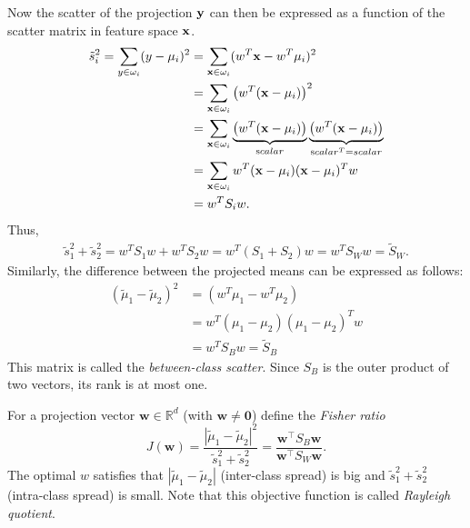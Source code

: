 Now the scatter of the projection ${\mathbf{y}}$ can then be expressed as a function of the scatter matrix in feature space ${\mathbf{x}}$.
\begin{align*}
	\tilde{s}_i^2 = \sum_{y\in \omega_i}(y-\mu_i)^2 &= \sum_{{\mathbf{x}}\in\omega_i}(w^T{\mathbf{x}} - w^T\mu_i)^2\\
													&= \sum_{{\mathbf{x}}\in\omega_i}\left(w^T({\mathbf{x}} - \mu_i)\right)^2\\
													&= \sum_{{\mathbf{x}}\in\omega_i}\underbrace{\left(w^T({\mathbf{x}} - \mu_i)\right)}_{\text scalar}\underbrace{\left(w^T({\mathbf{x}} - \mu_i)\right)}_{\text scalar^T=scalar}\\
													&= \sum_{{\mathbf{x}}\in\omega_i}w^T({\mathbf{x}} - \mu_i)({\mathbf{x}} - \mu_i)^Tw\\
													&= w^TS_iw.
\end{align*}
Thus, 
\begin{align*}
	\tilde{s}_1^2+\tilde{s}_2^2 = w^TS_1w+w^TS_2w = w^T(S_1+S_2)w = w^TS_Ww = \tilde{S}_W.
\end{align*}
Similarly, the difference between the projected means can be expressed as follows:
\begin{align*}
	(\tilde{\mu}_1-\tilde{\mu}_2)^2 &= (w^T\mu_1-w^T\mu_2)\\
									&= w^T(\mu_1-\mu_2)(\mu_1-\mu_2)^Tw\\
									&= w^TS_Bw = \tilde{S}_B
\end{align*}
This matrix is called the \textit{between-class scatter}. Since $S_B$ is the outer product of two vectors, its rank is at most one.

For a projection vector $\mathbf w\in\mathbb R^{d}$ (with $\mathbf w\neq\mathbf 0$) define the
\emph{Fisher ratio}
\[
	J(\mathbf w) = \frac{|\tilde{\mu}_1-\tilde{\mu}_2|^2}{\tilde{s}_1^2+\tilde{s}_2^2} = \frac{\mathbf w^{\top}S_B\mathbf w}{\mathbf w^{\top}S_W\mathbf w}.
\]
The optimal $w$ satisfies that $|\tilde{\mu}_1-\tilde{\mu}_2|$ (inter-class spread) is big and $\tilde{s}_1^2+\tilde{s}_2^2$ (intra-class spread) is small. Note that this objective function is called \textit{Rayleigh quotient}.

